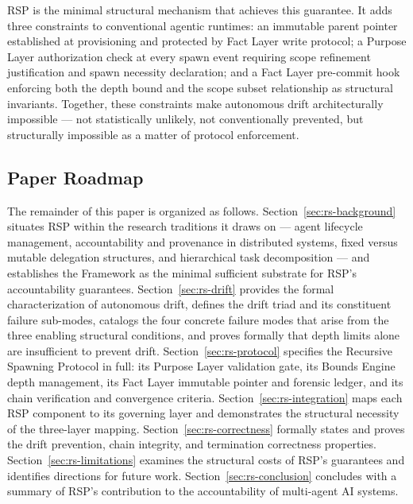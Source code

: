 RSP is the minimal structural mechanism that achieves this guarantee. It adds three constraints to conventional agentic runtimes: an immutable parent pointer established at provisioning and protected by Fact Layer write protocol; a Purpose Layer authorization check at every spawn event requiring scope refinement justification and spawn necessity declaration; and a Fact Layer pre-commit hook enforcing both the depth bound and the scope subset relationship as structural invariants. Together, these constraints make autonomous drift architecturally impossible — not statistically unlikely, not conventionally prevented, but structurally impossible as a matter of protocol enforcement.

\subsection{Paper Roadmap}

The remainder of this paper is organized as follows. Section~\ref{sec:rs-background} situates RSP within the research traditions it draws on — agent lifecycle management, accountability and provenance in distributed systems, fixed versus mutable delegation structures, and hierarchical task decomposition — and establishes the \bxthree Framework as the minimal sufficient substrate for RSP's accountability guarantees. Section~\ref{sec:rs-drift} provides the formal characterization of autonomous drift, defines the drift triad and its constituent failure sub-modes, catalogs the four concrete failure modes that arise from the three enabling structural conditions, and proves formally that depth limits alone are insufficient to prevent drift. Section~\ref{sec:rs-protocol} specifies the Recursive Spawning Protocol in full: its Purpose Layer validation gate, its Bounds Engine depth management, its Fact Layer immutable pointer and forensic ledger, and its chain verification and convergence criteria. Section~\ref{sec:rs-integration} maps each RSP component to its governing \bxthree layer and demonstrates the structural necessity of the three-layer mapping. Section~\ref{sec:rs-correctness} formally states and proves the drift prevention, chain integrity, and termination correctness properties. Section~\ref{sec:rs-limitations} examines the structural costs of RSP's guarantees and identifies directions for future work. Section~\ref{sec:rs-conclusion} concludes with a summary of RSP's contribution to the accountability of multi-agent AI systems.
